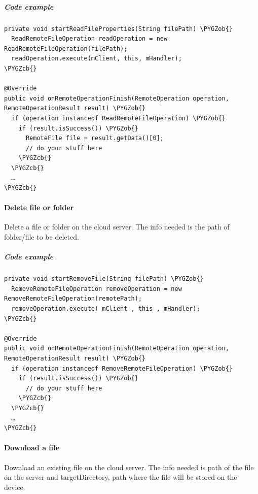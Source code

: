 \documentclass[letterpaper,10pt,english]{sphinxmanual}
\def\PYGZob{\char`\{}
\def\PYGZcb{\char`\}}
\begin{document}
\subparagraph{Code example}
\label{android_library/examples:id4}
\begin{Verbatim}[commandchars=\\\{\}]
private void startReadFileProperties(String filePath) \PYGZob{}
  ReadRemoteFileOperation readOperation = new ReadRemoteFileOperation(filePath);
  readOperation.execute(mClient, this, mHandler);
\PYGZcb{}

@Override
public void onRemoteOperationFinish(RemoteOperation operation, RemoteOperationResult result) \PYGZob{}
  if (operation instanceof ReadRemoteFileOperation) \PYGZob{}
    if (result.isSuccess()) \PYGZob{}
      RemoteFile file = result.getData()[0];
      // do your stuff here
    \PYGZcb{}
  \PYGZcb{}
  …
\PYGZcb{}
\end{Verbatim}


\paragraph{Delete file or folder}
\label{android_library/examples:delete-file-or-folder}
Delete a file or folder on the cloud server. The info needed is the path of
folder/file to be deleted.


\subparagraph{Code example}
\label{android_library/examples:id5}
\begin{Verbatim}[commandchars=\\\{\}]
private void startRemoveFile(String filePath) \PYGZob{}
  RemoveRemoteFileOperation removeOperation = new RemoveRemoteFileOperation(remotePath);
  removeOperation.execute( mClient , this , mHandler);
\PYGZcb{}

@Override
public void onRemoteOperationFinish(RemoteOperation operation, RemoteOperationResult result) \PYGZob{}
  if (operation instanceof RemoveRemoteFileOperation) \PYGZob{}
    if (result.isSuccess()) \PYGZob{}
      // do your stuff here
    \PYGZcb{}
  \PYGZcb{}
  …
\PYGZcb{}
\end{Verbatim}


\paragraph{Download a file}
\label{android_library/examples:download-a-file}
Download an existing file on the cloud server. The info needed is path of the
file on the server and targetDirectory, path where the file will be stored on
the device.
\end{document}
